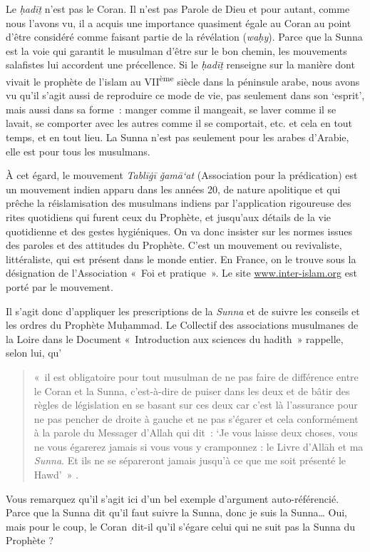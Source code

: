 Le \emph{ḥadīṯ} n'est pas le Coran. Il n'est pas Parole de Dieu et pour
autant, comme nous l'avons vu, il a acquis une importance quasiment
égale au Coran au point d'être considéré comme faisant partie de la
révélation (\emph{waḥy}). Parce que la Sunna est la voie qui garantit le
musulman d'être sur le bon chemin, les mouvements salafistes lui
accordent une précellence. Si le \emph{ḥadīṯ} renseigne sur la manière
dont vivait le prophète de l'islam au VII\textsuperscript{ème} siècle
dans la péninsule arabe, nous avons vu qu'il s'agit aussi de reproduire
ce mode de vie, pas seulement dans son `esprit', mais aussi dans sa
forme~: manger comme il mangeait, se laver comme il se lavait, se
comporter avec les autres comme il se comportait, etc. et cela en tout
temps, et en tout lieu. La Sunna n'est pas seulement pour les arabes
d'Arabie, elle est pour tous les musulmans.

À cet égard, le mouvement \emph{Tablīġī ǧamā`at} (Association pour la
prédication) est un mouvement indien apparu dans les années 20, de
nature apolitique et qui prêche la réislamisation des musulmans indiens
par l'application rigoureuse des rites quotidiens qui furent ceux du
Prophète, et jusqu'aux détails de la vie quotidienne et des gestes
hygiéniques. On va donc insister sur les normes issues des paroles et
des attitudes du Prophète. C'est un mouvement ou revivaliste,
littéraliste, qui est présent dans le monde entier. En France, on le
trouve sous la désignation de l'Association «~Foi et pratique~». Le site
\url{www.inter-islam.org}
est porté par le mouvement.

Il s'agit donc d'appliquer les prescriptions de la \emph{Sunna} et de
suivre les conseils et les ordres du Prophète Muḥammad. Le Collectif des
associations musulmanes de la Loire dans le Document «~Introduction aux
sciences du hadith~» rappelle, selon lui, qu'

\begin{quote}
  «~il est obligatoire pour
tout musulman de ne pas faire de différence entre le Coran et la Sunna,
c'est-à-dire de puiser dans les deux et de bâtir des règles de
législation en se basant sur ces deux car c'est là l'assurance pour ne
pas pencher de droite à gauche et ne pas s'égarer et cela conformément à
la parole du Messager d'Allah qui dit~: `Je vous laisse deux choses,
vous ne vous égarerez jamais si vous vous y cramponnez : le Livre
d'Allāh et ma \emph{Sunna}. Et ils ne se sépareront jamais jusqu'à ce
que me soit présenté le Hawd'~»  .
\end{quote}
 Vous remarquez qu'il s'agit ici d'un bel exemple d'argument
auto-référencié. Parce que la Sunna dit qu'il faut suivre la Sunna, donc
je suis la Sunna\ldots{} Oui, mais pour le coup, le Coran~dit-il qu'il
s'égare celui qui ne suit pas la Sunna du Prophète ?

